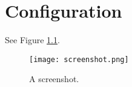 \chapter{Configuration}
\label{chapter:configuration}

See Figure \ref{figure:example}.

\begin{figure}[htp]
  \centering
  \texttt{[image: screenshot.png]}
  \caption{A screenshot.}
  \label{figure:example}
\end{figure}